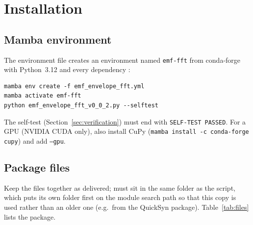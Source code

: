 \documentclass[10pt,letterpaper]{article}
\numberwithin{equation}{section}
\begin{document}
\section{Installation}\label{sec:install}

\subsection{Mamba environment}
The environment file creates an environment named \texttt{emf-fft} from
conda-forge with Python~3.12 and every dependency \cite{B36}:
\begin{Verbatim}
mamba env create -f emf_envelope_fft.yml
mamba activate emf-fft
python emf_envelope_fft_v0_0_2.py --selftest
\end{Verbatim}
The self-test (Section~\ref{sec:verification}) must end with
\texttt{SELF-TEST PASSED}. For a GPU (NVIDIA CUDA only), also install CuPy
(\texttt{mamba install -c conda-forge cupy}) and add \texttt{--gpu}.

\subsection{Package files}
Keep the files together as delivered;  must sit in the
same folder as the script, which puts its own folder first on the module search
path so that this copy is used rather than an older one (e.g.\ from the
QuickSyn package). Table~\ref{tab:files} lists the package.
\end{document}
